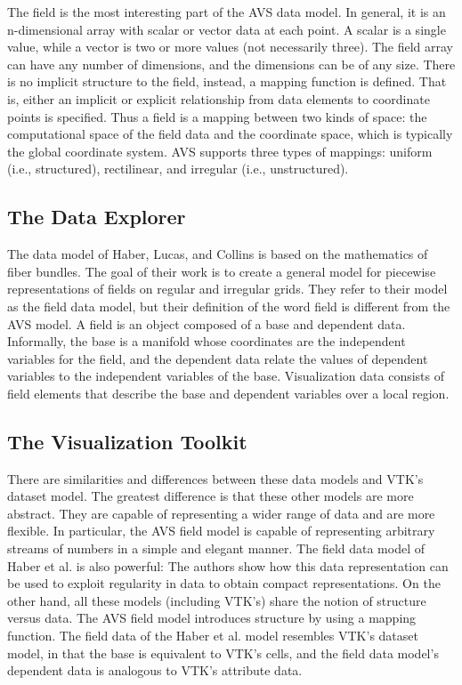 The field is the most interesting part of the AVS data model. In general, it is an n-dimensional array with scalar or vector data at each point. A scalar is a single value, while a vector is two or more values (not necessarily three). The field array can have any number of dimensions, and the dimensions can be of any size. There is no implicit structure to the field, instead, a mapping function is defined. That is, either an implicit or explicit relationship from data elements to coordinate points is specified. Thus a field is a mapping between two kinds of space: the computational space of the field data and the coordinate space, which is typically the global coordinate system. AVS supports three types of mappings: uniform (i.e., structured), rectilinear, and irregular (i.e., unstructured).

\subsection{The Data Explorer}

The data model of Haber, Lucas, and Collins \cite{Haber91} is based on the mathematics of fiber bundles. The goal of their work is to create a general model for piecewise representations of fields on regular and irregular grids. They refer to their model as the field data model, but their definition of the word field is different from the AVS model. A field is an object composed of a base and dependent data. Informally, the base is a manifold whose coordinates are the independent variables for the field, and the dependent data relate the values of dependent variables to the independent variables of the base. Visualization data consists of field elements that describe the base and dependent variables over a local region.

\subsection{The Visualization Toolkit}

There are similarities and differences between these data models and VTK’s dataset model. The greatest difference is that these other models are more abstract. They are capable of representing a wider range of data and are more flexible. In particular, the AVS field model is capable of representing arbitrary streams of numbers in a simple and elegant manner. The field data model of Haber et al. is also powerful: The authors show how this data representation can be used to exploit regularity in data to obtain compact representations. On the other hand, all these models (including VTK’s) share the notion of structure versus data. The AVS field model introduces structure by using a mapping function. The field data of the Haber et al. model resembles VTK’s dataset model, in that the base is equivalent to VTK’s cells, and the field data model’s dependent data is analogous to VTK’s attribute data.

